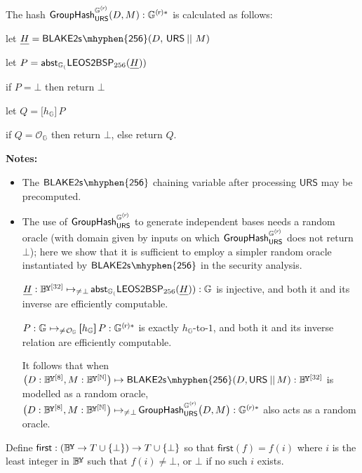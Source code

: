 \documentclass{article}
\newcommand{\callout}[1]{\vspace{2ex plus 2pt minus 2pt}\noindent\textbf{#1}\hspace{1em}}
\newenvironment{pnotes}{\callout{Notes:}\begin{itemize}}{\end{itemize}}
\newcommand{\typecolon}{:}
\newcommand{\bytes}[1]{\underline{\raisebox{-0.3ex}{}\smash{#1}}}
\newcommand{\overlap}[2]{\rlap{#2}\hspace{#1}{#2}}
\newcommand{\byte}{\mathbb{B}\kern -0.1em\raisebox{0.48ex}{\overlap{0.0001em}{\scalebox{0.7}{$\mathbb{Y}$}}}}
\newcommand{\Nat}{\mathbb{N}}
\newcommand{\typeexp}[2]{{#1}\vphantom{)}^{[{#2}]}}
\newcommand{\byteseq}[1]{\typeexp{\byte}{#1}}
\newcommand{\byteseqs}{\byteseq{\Nat}}
\newcommand{\bconcat}{\mathop{\kern 0.05em||}}
\newcommand{\fun}[2]{{#1} \mapsto {#2}}
\newcommand{\exclusivefun}[3]{{#1} \mapsto_{\neq\kern 0.05em{#3}\!} {#2}}
\newcommand{\first}{\mathsf{first}}
\newcommand{\setof}[1]{\{{#1}\}}
\newcommand{\scalarmult}[2]{\boldsymbol{[}{#1}\boldsymbol{]}\,{#2}}
\newcommand{\union}{\cup}
\newcommand{\maybe}[1]{{#1} \union \setof{\bot}}
\newcommand{\BlakeTwos}[1]{\mathsf{BLAKE2s\kern 0.05em\mhyphen{#1}}}
\newcommand{\Zero}{\mathcal{O}}
\newcommand{\subgroupr}{(\kern-0.075emr\kern-0.075em)}
\newcommand{\GroupHash}{\mathsf{GroupHash}}
\newcommand{\ParamG}[1]{{{#1}_\mathbb{G}}}
\newcommand{\GroupG}[1]{\mathbb{G}_{#1}}
\newcommand{\SubgroupG}[1]{\GroupG{#1}^{\subgroupr}}
\newcommand{\SubgroupGstar}[1]{\GroupG{#1}^{\subgroupr\ast}}
\newcommand{\ZeroG}[1]{\Zero_{\GroupG{#1}}}
\newcommand{\abstG}[1]{\abst_{\GroupG{#1}}}
\newcommand{\GroupGHash}[1]{\GroupHash^{\SubgroupG{}}_{#1}}
\newcommand{\URS}{\mathsf{URS}}
\newcommand{\HashOutput}{\bytes{H}}
\newcommand{\abst}{\mathsf{abst}}
\newcommand{\LEOStoBSP}[1]{\mathsf{LEOS2BSP}_{#1}}
\begin{document}
The hash $\GroupGHash{\URS}(D, M) \typecolon \SubgroupGstar{}$ is calculated as follows:

\begin{algorithm}
  \item let $\HashOutput = \BlakeTwos{256}(D,\, \URS \bconcat\, M)$
  \item let $P = \abstG(\LEOStoBSP{256}(\HashOutput))$
  \item if $P = \bot$ then return $\bot$
  \item let $Q = \scalarmult{\ParamG{h}}{P}$
  \item if $Q = \ZeroG{}$ then return $\bot$, else return $Q$.
\end{algorithm}

\begin{pnotes}
  \item The $\BlakeTwos{256}$ chaining variable after processing $\URS$ may be precomputed.
  \item The use of $\GroupGHash{\URS}$ to generate independent bases
        needs a random oracle (with domain given by inputs on which $\GroupGHash{\URS}$ does not return $\bot$);
        here we show that it is sufficient to employ a simpler random oracle instantiated by
        $\vphantom{a^b}\BlakeTwos{256}$ in the security analysis.

        $\exclusivefun{\HashOutput \typecolon \byteseq{32}}
          {\abstG(\LEOStoBSP{256}(\HashOutput)) \typecolon \GroupG{}}{\bot}$
        is injective, and both it and its inverse are efficiently computable.

        $\exclusivefun{P \typecolon \GroupG{}}
          {\scalarmult{\ParamG{h}}{P} \typecolon \SubgroupGstar{}}{\ZeroG{}}$
        is exactly $\ParamG{h}$-to-$1$, and both it and its inverse relation are efficiently computable.

        It follows that when $\fun{\big(D \typecolon \byteseq{8}, M \typecolon \byteseqs\big)}
          {\BlakeTwos{256}(D, \URS \bconcat M) \typecolon \byteseq{32}}$
        is modelled as a random oracle, $\exclusivefun{\big(D \typecolon \byteseq{8}, M \typecolon \byteseqs\big)}
          {\GroupGHash{\URS}\big(D, M\big) \typecolon \SubgroupGstar{}}{\bot}$ also acts as a random oracle.
\end{pnotes}

Define $\first \typecolon (\byte \rightarrow \maybe{T}) \rightarrow \maybe{T}$
so that $\first(f) = f(i)$ where $i$ is the least integer in $\byte$
such that $f(i) \neq \bot$, or $\bot$ if no such $i$ exists.
\end{document}
